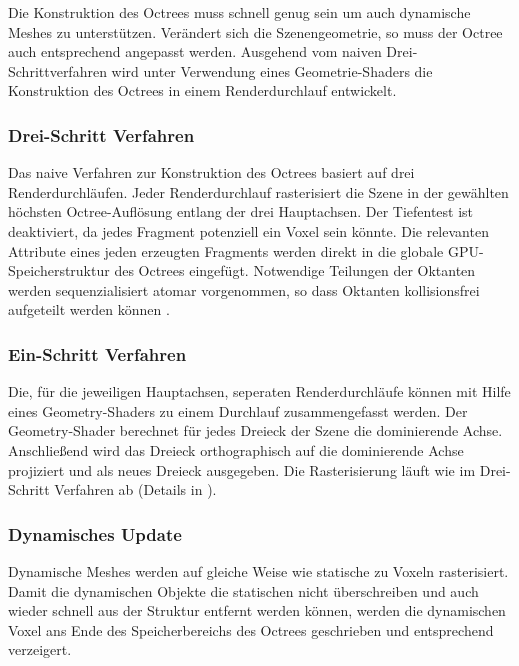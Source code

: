 Die Konstruktion des Octrees muss schnell genug sein um auch dynamische Meshes zu unterstützen. Verändert sich die Szenengeometrie, so muss der Octree auch entsprechend angepasst werden. Ausgehend vom naiven Drei-Schrittverfahren wird unter Verwendung eines Geometrie-Shaders die Konstruktion des Octrees in einem Renderdurchlauf entwickelt.

\subsubsection{Drei-Schritt Verfahren}

Das naive Verfahren zur Konstruktion des Octrees basiert auf drei Renderdurchläufen. Jeder Renderdurchlauf rasterisiert die Szene in der gewählten höchsten Octree-Auflösung entlang der drei Hauptachsen. Der Tiefentest ist deaktiviert, da jedes Fragment potenziell ein Voxel sein könnte. Die relevanten Attribute eines jeden erzeugten Fragments werden direkt in die globale GPU-Speicherstruktur des Octrees eingefügt. Notwendige Teilungen der Oktanten werden sequenzialisiert atomar vorgenommen, so dass Oktanten kollisionsfrei aufgeteilt werden können \cite[4.2.1]{CNSGE11b}.

\subsubsection{Ein-Schritt Verfahren}

Die, für die jeweiligen Hauptachsen, seperaten Renderdurchläufe können mit Hilfe eines Geometry-Shaders zu einem Durchlauf zusammengefasst werden. Der Geometry-Shader berechnet für jedes Dreieck der Szene die dominierende Achse. Anschließend wird das Dreieck orthographisch auf die dominierende Achse projiziert und als neues Dreieck ausgegeben. Die Rasterisierung läuft wie im Drei-Schritt Verfahren ab (Details in \cite{Crassin12, OpenGL Insights  22.1}).

\subsubsection{Dynamisches Update}

Dynamische Meshes werden auf gleiche Weise wie statische zu Voxeln rasterisiert. Damit die dynamischen Objekte die statischen nicht überschreiben und auch wieder schnell aus der Struktur entfernt werden können, werden die dynamischen Voxel ans Ende des Speicherbereichs des Octrees geschrieben und entsprechend verzeigert.

